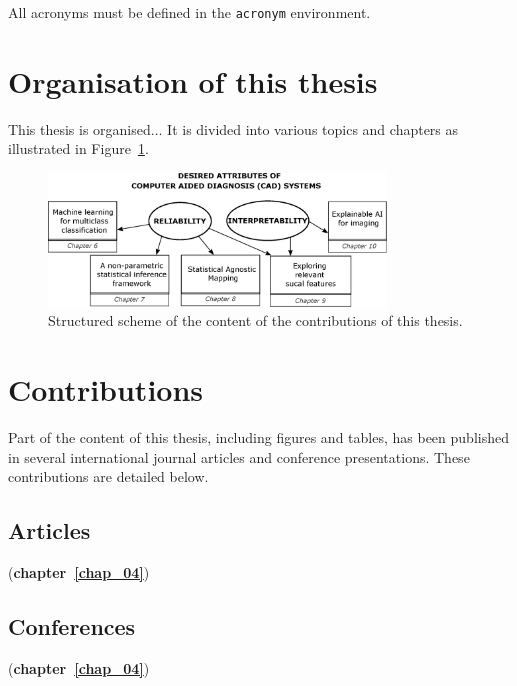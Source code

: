 All acronyms must be defined in the \texttt{acronym} environment.


\section{Organisation of this thesis}\label{sec_organization}

This thesis is organised... It is divided into various topics and chapters as illustrated in Figure~\ref{fig:01_objetivos}.

\begin{figure}[htbp]
\centering
\includegraphics[width=0.8\textwidth]{Figures/chap_01/objetivos}
\caption{Structured scheme of the content of the contributions of this thesis. }
\label{fig:01_objetivos}
\end{figure}


\section{Contributions}\label{sec_controbutions}

Part of the content of this thesis, including figures and tables, has been published in several international journal articles and conference presentations. These contributions are detailed below.

\subsection*{Articles}

 (\textbf{chapter~\ref{chap_04}})


\subsection*{Conferences}

 (\textbf{chapter~\ref{chap_04}})




